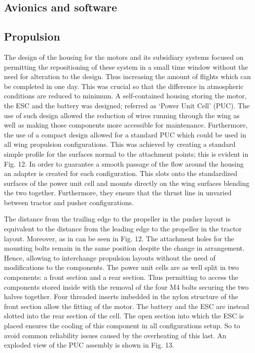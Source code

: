 \documentclass[../../main.tex]{subfiles}
\begin{document}
\subsection{Avionics and software} \label{sec:design-process:final-design-proposal:avionics-and-software}


\subsection{Propulsion} \label{sec:design-process:final-design-proposal:propulsion}

The design of the housing for the motors and its subsidiary systems focused on permitting the repositioning of these system in a small time window without the need for alteration to the design.
Thus increasing the amount of flights which can be completed in one day.
This was crucial so that the difference in atmospheric conditions are reduced to minimum. 
A self-contained housing storing the motor, the ESC and the battery was designed; referred as ‘Power Unit Cell’ (PUC).
The use of such design allowed the reduction of wires running through the wing as well as making those components more accessible for maintenance.
Furthermore, the use of a compact design allowed for a standard PUC which could be used in all wing propulsion configurations.
This was achieved by creating a standard simple profile for the surfaces normal to the attachment points; this is evident in Fig. 12.
In order to guarantee a smooth passage of the flow around the housing an adapter is created for each configuration.
This slots onto the standardized surfaces of the power unit cell and mounts directly on the wing surfaces blending the two together.
Furthermore, they ensure that the thrust line in unvaried between tractor and pusher configurations. 


The distance from the trailing edge to the propeller in the pusher layout is equivalent to the distance from the leading edge to the propeller in the tractor layout.
Moreover, as in can be seen in Fig. 12.
The attachment holes for the mounting bolts remain in the same position despite the change in arrangement.
Hence, allowing to interchange propulsion layouts without the need of modifications to the components. 
The power unit cells are as well split in two components: a front section and a rear section.
Thus permitting to access the components stored inside with the removal of the four M4 bolts securing the two halves together.
Four threaded inserts imbedded in the nylon structure of the front section allow the fitting of the motor.
The battery and the ESC are instead slotted into the rear section of the cell.
The open section into which the ESC is placed ensures the cooling of this component in all configurations setup.
So to avoid common reliability issues caused by the overheating of this last.
An exploded view of the PUC assembly is shown in Fig. 13. 
\end{document}
